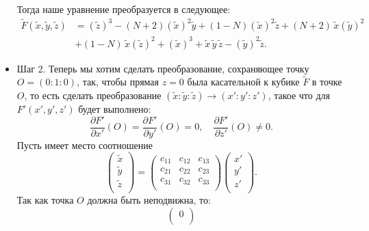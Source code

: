 \documentclass[a4paper,12pt]{article}
\theoremstyle{definition}
\begin{document}
\begin{itemize}[leftmargin=0.6cm]
        Тогда наше уравнение преобразуется в следующее:  
        \begin{align*}
            \widetilde{F}(\widetilde{x}, \widetilde{y}, \widetilde{z}) &= 
         \left(\widetilde{z}\right)^3
         -(N + 2) \left(\widetilde{x}\right)^2 \widetilde{y} + (1 - N)
         \left(\widetilde{x}\right)^2 \widetilde{z} + (N + 2) \,
         \widetilde{x} \left(\widetilde{y}\right)^2 \\ 
         &+ (1 - N) \, \widetilde{x} \left(\widetilde{z}\right)^2 + 
         \left(\widetilde{x}\right)^3 + \widetilde{x} \,
         \widetilde{y} \, \widetilde{z} -
         \left(\widetilde{y}\right)^2 \widetilde{z}
        .\end{align*}
        

        \item Шаг 2. Теперь мы хотим сделать преобразование,
        сохраняющее точку \(O = (0 : 1 : 0)\), так, чтобы
        прямая \(z = 0\) была касательной к кубике \(\widetilde{F}\) в точке
        \(O\), то есть сделать преобразование \((\widetilde{x} :
        \widetilde{y} : \widetilde{z}) \to (x' : y' : z')\), такое что
        для \(F'(x', y', z')\) будет выполнено: 
         \[
        \frac{\partial F'}{\partial x'} (O) = \frac{\partial F'}{\partial y'}
        (O) = 0, \quad \frac{\partial F'}{\partial z'} (O) \ne 0
        .\]
        Пусть имеет место соотношение
        \[
        \begin{pmatrix}
            \widetilde{x} \\
            \widetilde{y} \\
            \widetilde{z} \\
        \end{pmatrix} 
        = 
        \begin{pmatrix}
            c_{11} & c_{12} & c_{13} \\
            c_{21} & c_{22} & c_{23} \\
            c_{31} & c_{32} & c_{33} \\
        \end{pmatrix}
        \begin{pmatrix}
            x' \\
            y' \\
            z' \\
        \end{pmatrix}
        .\] 
        Так как точка \(O\) должна быть неподвижна, то:
        \[
        \begin{pmatrix}
            0 \\

\end{pmatrix}\]
\end{itemize}
\end{document}
